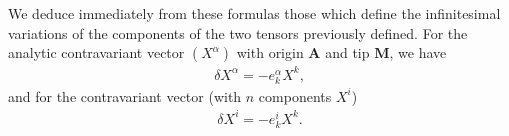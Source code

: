 We deduce immediately from these formulas those which define the infinitesimal variations of the components of the two tensors previously defined. For the analytic contravariant vector $(X^\alpha)$ with origin $\bm A$ and tip $\bm M$, we have 
\begin{eqnarray*}
\delta X^\alpha = - e^\alpha_k X^k,
\end{eqnarray*}
and for the contravariant vector (with $n$ components $X^i$)
\begin{eqnarray*}
\delta X^i = - e^i_k X^k .
\end{eqnarray*}














































































































